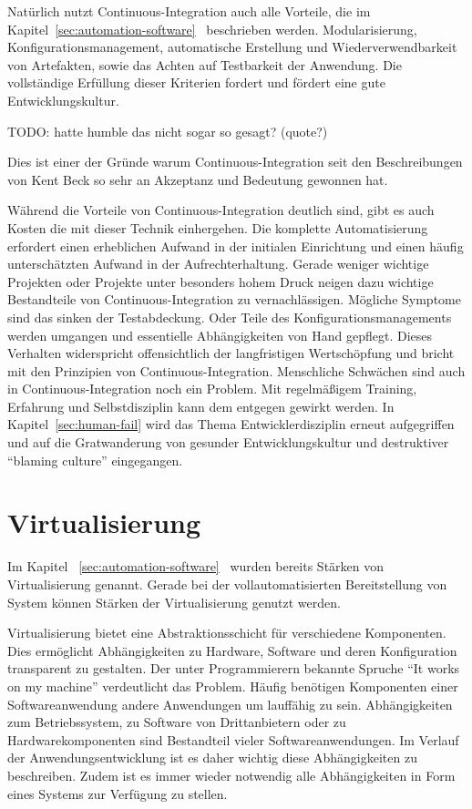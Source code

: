 Natürlich nutzt Continuous-Integration auch alle Vorteile, die im 
Kapitel~\ref{sec:automation-software}~ beschrieben werden. Modularisierung, 
Konfigurationsmanagement, automatische Erstellung und Wiederverwendbarkeit von Artefakten, sowie das Achten auf 
Testbarkeit der Anwendung. Die vollständige Erfüllung dieser Kriterien fordert und fördert eine gute Entwicklungskultur.

TODO: hatte humble das nicht sogar so gesagt? (quote?)
 
Dies ist einer der Gründe warum Continuous-Integration seit den Beschreibungen 
von Kent Beck so sehr an Akzeptanz und Bedeutung gewonnen hat.

Während die Vorteile von Continuous-Integration deutlich sind, gibt es auch Kosten die mit dieser Technik einhergehen. 
Die komplette Automatisierung erfordert einen erheblichen Aufwand in der initialen Einrichtung und einen häufig 
unterschätzten Aufwand in der Aufrechterhaltung. Gerade weniger wichtige Projekten oder Projekte unter besonders hohem 
Druck neigen dazu wichtige Bestandteile von Continuous-Integration zu vernachlässigen. Mögliche Symptome sind das sinken 
der Testabdeckung. Oder Teile des Konfigurationsmanagements werden umgangen und essentielle Abhängigkeiten von Hand 
gepflegt. Dieses Verhalten widerspricht offensichtlich der langfristigen Wertschöpfung und bricht mit den Prinzipien von 
Continuous-Integration. Menschliche Schwächen sind auch in Continuous-Integration noch ein Problem. Mit regelmäßigem 
Training, Erfahrung und Selbstdisziplin kann dem entgegen gewirkt werden. In Kapitel~\ref{sec:human-fail} wird das Thema 
Entwicklerdisziplin erneut aufgegriffen und auf die Gratwanderung von gesunder Entwicklungskultur und destruktiver 
``blaming culture'' eingegangen.

\section{Virtualisierung}

Im Kapitel ~\ref{sec:automation-software}~ wurden bereits Stärken von Virtualisierung 
genannt. Gerade bei der vollautomatisierten Bereitstellung von System können Stärken der Virtualisierung genutzt werden.

Virtualisierung bietet eine Abstraktionsschicht für verschiedene Komponenten. Dies ermöglicht Abhängigkeiten zu Hardware, 
Software und deren Konfiguration transparent zu gestalten. Der unter Programmierern bekannte Spruche ``It works on my 
machine'' verdeutlicht das Problem. Häufig benötigen Komponenten einer Softwareanwendung andere Anwendungen um lauffähig 
zu sein. Abhängigkeiten zum Betriebssystem, zu Software von Drittanbietern oder zu Hardwarekomponenten sind Bestandteil 
vieler Softwareanwendungen. Im Verlauf der Anwendungsentwicklung ist es daher wichtig diese Abhängigkeiten zu 
beschreiben. Zudem ist es immer wieder notwendig alle Abhängigkeiten in Form eines Systems zur Verfügung zu stellen.

